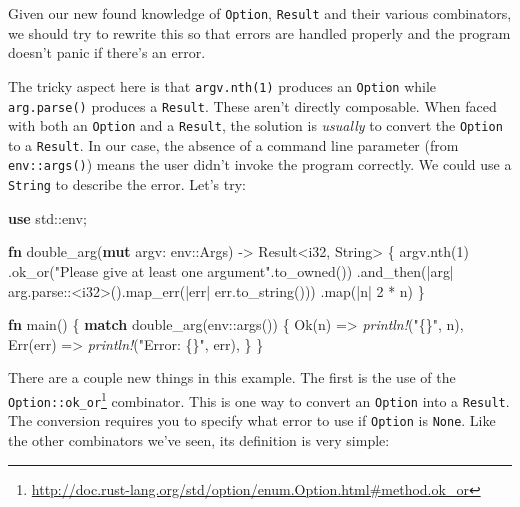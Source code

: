 \documentclass[a4paper,]{book}
\newenvironment{Shaded}{\begin{snugshade}}{\end{snugshade}}
\newcommand{\KeywordTok}[1]{\textcolor[rgb]{0.13,0.29,0.53}{\textbf{{#1}}}}
\newcommand{\DataTypeTok}[1]{\textcolor[rgb]{0.13,0.29,0.53}{{#1}}}
\newcommand{\DecValTok}[1]{\textcolor[rgb]{0.00,0.00,0.81}{{#1}}}
\newcommand{\ConstantTok}[1]{\textcolor[rgb]{0.00,0.00,0.00}{{#1}}}
\newcommand{\StringTok}[1]{\textcolor[rgb]{0.31,0.60,0.02}{{#1}}}
\newcommand{\PreprocessorTok}[1]{\textcolor[rgb]{0.56,0.35,0.01}{\textit{{#1}}}}
\newcommand{\NormalTok}[1]{{#1}}
\renewcommand{\href}[2]{#2\footnote{\url{#1}}}
\begin{document}
Given our new found knowledge of \texttt{Option}, \texttt{Result} and
their various combinators, we should try to rewrite this so that errors
are handled properly and the program doesn't panic if there's an error.

The tricky aspect here is that \texttt{argv.nth(1)} produces an
\texttt{Option} while \texttt{arg.parse()} produces a \texttt{Result}.
These aren't directly composable. When faced with both an
\texttt{Option} and a \texttt{Result}, the solution is \emph{usually} to
convert the \texttt{Option} to a \texttt{Result}. In our case, the
absence of a command line parameter (from \texttt{env::args()}) means
the user didn't invoke the program correctly. We could use a
\texttt{String} to describe the error. Let's try:

\protect\hypertarget{code-error-double-string}{}{}

\begin{Shaded}
\begin{Highlighting}[]
\KeywordTok{use} \NormalTok{std::env;}

\KeywordTok{fn} \NormalTok{double_arg(}\KeywordTok{mut} \NormalTok{argv: env::Args) -> }\DataTypeTok{Result}\NormalTok{<}\DataTypeTok{i32}\NormalTok{, }\DataTypeTok{String}\NormalTok{> \{}
    \NormalTok{argv.nth(}\DecValTok{1}\NormalTok{)}
        \NormalTok{.ok_or(}\StringTok{"Please give at least one argument"}\NormalTok{.to_owned())}
        \NormalTok{.and_then(|arg| arg.parse::<}\DataTypeTok{i32}\NormalTok{>().map_err(|err| err.to_string()))}
        \NormalTok{.map(|n| }\DecValTok{2} \NormalTok{* n)}
\NormalTok{\}}

\KeywordTok{fn} \NormalTok{main() \{}
    \KeywordTok{match} \NormalTok{double_arg(env::args()) \{}
        \ConstantTok{Ok}\NormalTok{(n) => }\PreprocessorTok{println!}\NormalTok{(}\StringTok{"\{\}"}\NormalTok{, n),}
        \ConstantTok{Err}\NormalTok{(err) => }\PreprocessorTok{println!}\NormalTok{(}\StringTok{"Error: \{\}"}\NormalTok{, err),}
    \NormalTok{\}}
\NormalTok{\}}
\end{Highlighting}
\end{Shaded}

There are a couple new things in this example. The first is the use of
the
\href{http://doc.rust-lang.org/std/option/enum.Option.html\#method.ok_or}{\texttt{Option::ok\_or}}
combinator. This is one way to convert an \texttt{Option} into a
\texttt{Result}. The conversion requires you to specify what error to
use if \texttt{Option} is \texttt{None}. Like the other combinators
we've seen, its definition is very simple:
\end{document}
